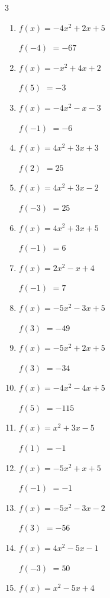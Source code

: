 \begin{multicols}{3}
\begin{enumerate}
$f(2)$
        $= -6$

\columnbreak %

  \item $f(x)=-4x^{2}+2x+5$

$f(-4)$
        $= -67$

  \item $f(x)=-x^{2}+4x+2$

$f(5)$
        $= -3$

  \item $f(x)=-4x^{2}-x-3$

$f(-1)$
        $= -6$

  \item $f(x)=4x^{2}+3x+3$

$f(2)$
        $= 25$

  \item $f(x)=4x^{2}+3x-2$

$f(-3)$
        $= 25$

  \item $f(x)=4x^{2}+3x+5$

$f(-1)$
        $= 6$

  \item $f(x)=2x^{2}-x+4$

$f(-1)$
        $= 7$

  \item $f(x)=-5x^{2}-3x+5$

$f(3)$
        $= -49$

  \item $f(x)=-5x^{2}+2x+5$

$f(3)$
        $= -34$

  \item $f(x)=-4x^{2}-4x+5$

$f(5)$
        $= -115$

  \item $f(x)=x^{2}+3x-5$

$f(1)$
        $= -1$

  \item $f(x)=-5x^{2}+x+5$

$f(-1)$
        $= -1$

  \item $f(x)=-5x^{2}-3x-2$

$f(3)$
        $= -56$

  \item $f(x)=4x^{2}-5x-1$

$f(-3)$
        $= 50$

  \item $f(x)=x^{2}-5x+4$


\end{enumerate}
\end{multicols}
